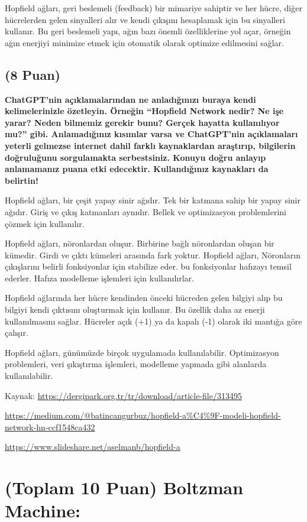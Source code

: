 \documentclass[11pt]{article}
\begin{document}
    Hopfield ağları, geri beslemeli (feedback) bir mimariye sahiptir ve her hücre, diğer hücrelerden gelen sinyalleri alır ve kendi çıkışını hesaplamak için bu sinyalleri kullanır. Bu geri beslemeli yapı, ağın bazı önemli özelliklerine yol açar, örneğin ağın enerjiyi minimize etmek için otomatik olarak optimize edilmesini sağlar.

\subsection{(8 Puan)} \textbf{ChatGPT’nin açıklamalarından ne anladığınızı buraya kendi kelimelerinizle özetleyin. Örneğin ``Hopfield Network nedir? Ne işe yarar? Neden bilmemiz gerekir bunu? Gerçek hayatta kullanılıyor mu?'' gibi. Anlamadığınız kısımlar varsa ve ChatGPT’nin açıklamaları yeterli gelmezse internet dahil farklı kaynaklardan araştırıp, bilgilerin doğruluğunu sorgulamakta serbestsiniz. Konuyu doğru anlayıp anlamamanız puana etki edecektir. Kullandığınız kaynakları da belirtin!}

    Hopfield ağları, bir çeşit yapay sinir ağıdır. Tek bir katmana sahip bir yapay sinir ağıdır. Giriş ve çıkış katmanları aynıdır. Bellek ve optimizasyon problemlerini çözmek için kullanılır. 
    
    Hopfield ağları, nöronlardan oluşur. Birbirine bağlı nöronlardan oluşan bir kümedir. Girdi ve çıktı kümeleri arasında fark yoktur. Hopfield ağları, Nöronların çıkışlarını belirli fonksiyonlar için stabilize eder. bu fonksiyonlar hafızayı temsil ederler. Hafıza modelleme işlemleri için kullanılırlar. 
    
    Hopfield ağlarında her hücre kendinden önceki hücreden gelen bilgiyi alıp bu bilgiyi kendi çıktısını oluşturmak için kullanır. Bu özellik daha az enerji kullanılmasını sağlar. Hücreler açık (+1) ya da kapalı (-1) olarak iki mantığa göre çalışır.
    
    Hopfield ağları, günümüzde birçok uygulamada kullanılabilir. Optimizasyon problemleri, veri şıkıştırma işlemleri, modelleme yapmada gibi alanlarda kullanılabilir.
    
Kaynak: \url{https://dergipark.org.tr/tr/download/article-file/313495}

        \url{https://medium.com/@batincangurbuz/hopfield-a%C4%9F-modeli-hopfield-network-hn-ccf1548ca432}

        \url{https://www.slideshare.net/aselmanb/hopfield-a}

\section{(Toplam 10 Puan) Boltzman Machine:}
\end{document}
